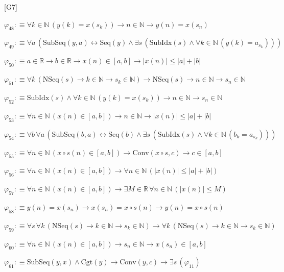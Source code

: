 \begin{fullproof}{[G7]}
\begin{abbrevlist}
\item $\varphi_{48} :\equiv \forall k \in \mathbb{N}\,(y(k) = x(s_{k})) \to n \in \mathbb{N} \to y(n) = x(s_{n})$
\item $\varphi_{49} :\equiv \forall a\,(\mathrm{SubSeq}(y,a) \leftrightarrow \mathrm{Seq}(y) \land \exists s\,(\mathrm{SubIdx}(s) \land \forall k \in \mathbb{N}\,(y(k) = a_{s_{k}})))$
\item $\varphi_{50} :\equiv a \in \mathbb{R} \to b \in \mathbb{R} \to x(n) \in [a,b] \to \lvert x(n) \rvert \leq \lvert a \rvert + \lvert b \rvert$
\item $\varphi_{51} :\equiv \forall k\,(\mathrm{NSeq}(s) \to k \in \mathbb{N} \to s_{k} \in \mathbb{N}) \to \mathrm{NSeq}(s) \to n \in \mathbb{N} \to s_{n} \in \mathbb{N}$
\item $\varphi_{52} :\equiv \mathrm{SubIdx}(s) \land \forall k \in \mathbb{N}\,(y(k) = x(s_{k})) \to n \in \mathbb{N} \to s_{n} \in \mathbb{N}$
\item $\varphi_{53} :\equiv \forall n \in \mathbb{N}\,(x(n) \in [a,b]) \to n \in \mathbb{N} \to \lvert x(n) \rvert \leq \lvert a \rvert + \lvert b \rvert$
\item $\varphi_{54} :\equiv \forall b\,\forall a\,(\mathrm{SubSeq}(b,a) \leftrightarrow \mathrm{Seq}(b) \land \exists s\,(\mathrm{SubIdx}(s) \land \forall k \in \mathbb{N}\,(b_{k} = a_{s_{k}})))$
\item $\varphi_{55} :\equiv \forall n \in \mathbb{N}\,(x \circ s(n) \in [a,b]) \to \mathrm{Conv}(x \circ s,c) \to c \in [a,b]$
\item $\varphi_{56} :\equiv \forall n \in \mathbb{N}\,(x(n) \in [a,b]) \to \forall n \in \mathbb{N}\,(\lvert x(n) \rvert \leq \lvert a \rvert + \lvert b \rvert)$
\item $\varphi_{57} :\equiv \forall n \in \mathbb{N}\,(x(n) \in [a,b]) \to \exists M \in \mathbb{R}\,\forall n \in \mathbb{N}\,(\lvert x(n) \rvert \leq M)$
\item $\varphi_{58} :\equiv y(n) = x(s_{n}) \to x(s_{n}) = x \circ s(n) \to y(n) = x \circ s(n)$
\item $\varphi_{59} :\equiv \forall s\,\forall k\,(\mathrm{NSeq}(s) \to k \in \mathbb{N} \to s_{k} \in \mathbb{N}) \to \forall k\,(\mathrm{NSeq}(s) \to k \in \mathbb{N} \to s_{k} \in \mathbb{N})$
\item $\varphi_{60} :\equiv \forall n \in \mathbb{N}\,(x(n) \in [a,b]) \to s_{n} \in \mathbb{N} \to x(s_{n}) \in [a,b]$
\item $\varphi_{61} :\equiv \mathrm{SubSeq}(y,x) \land \mathrm{Cgt}(y) \to \mathrm{Conv}(y,c) \to \exists s\,(\varphi_{11})$

\end{abbrevlist}
\end{fullproof}
